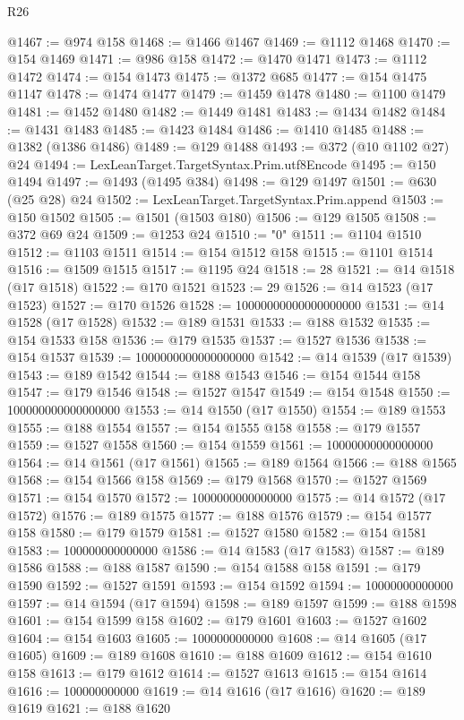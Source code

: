 \begin{lexlean}{R26}
\begin{coremodule}
@1467 := @974 @158
@1468 := @1466 @1467
@1469 := @1112 @1468
@1470 := @154 @1469
@1471 := @986 @158
@1472 := @1470 @1471
@1473 := @1112 @1472
@1474 := @154 @1473
@1475 := @1372 @685
@1477 := @154 @1475 @1147
@1478 := @1474 @1477
@1479 := @1459 @1478
@1480 := @1100 @1479
@1481 := @1452 @1480
@1482 := @1449 @1481
@1483 := @1434 @1482
@1484 := @1431 @1483
@1485 := @1423 @1484
@1486 := @1410 @1485
@1488 := @1382 (@1386 @1486)
@1489 := @129 @1488
@1493 := @372 (@10 @1102 @27) @24
@1494 := LexLeanTarget.TargetSyntax.Prim.utf8Encode
@1495 := @150 @1494
@1497 := @1493 (@1495 @384)
@1498 := @129 @1497
@1501 := @630 (@25 @28) @24
@1502 := LexLeanTarget.TargetSyntax.Prim.append
@1503 := @150 @1502
@1505 := @1501 (@1503 @180)
@1506 := @129 @1505
@1508 := @372 @69 @24
@1509 := @1253 @24
@1510 := "0"
@1511 := @1104 @1510
@1512 := @1103 @1511
@1514 := @154 @1512 @158
@1515 := @1101 @1514
@1516 := @1509 @1515
@1517 := @1195 @24
@1518 := 28
@1521 := @14 @1518 (@17 @1518)
@1522 := @170 @1521
@1523 := 29
@1526 := @14 @1523 (@17 @1523)
@1527 := @170 @1526
@1528 := 10000000000000000000
@1531 := @14 @1528 (@17 @1528)
@1532 := @189 @1531
@1533 := @188 @1532
@1535 := @154 @1533 @158
@1536 := @179 @1535
@1537 := @1527 @1536
@1538 := @154 @1537
@1539 := 1000000000000000000
@1542 := @14 @1539 (@17 @1539)
@1543 := @189 @1542
@1544 := @188 @1543
@1546 := @154 @1544 @158
@1547 := @179 @1546
@1548 := @1527 @1547
@1549 := @154 @1548
@1550 := 100000000000000000
@1553 := @14 @1550 (@17 @1550)
@1554 := @189 @1553
@1555 := @188 @1554
@1557 := @154 @1555 @158
@1558 := @179 @1557
@1559 := @1527 @1558
@1560 := @154 @1559
@1561 := 10000000000000000
@1564 := @14 @1561 (@17 @1561)
@1565 := @189 @1564
@1566 := @188 @1565
@1568 := @154 @1566 @158
@1569 := @179 @1568
@1570 := @1527 @1569
@1571 := @154 @1570
@1572 := 1000000000000000
@1575 := @14 @1572 (@17 @1572)
@1576 := @189 @1575
@1577 := @188 @1576
@1579 := @154 @1577 @158
@1580 := @179 @1579
@1581 := @1527 @1580
@1582 := @154 @1581
@1583 := 100000000000000
@1586 := @14 @1583 (@17 @1583)
@1587 := @189 @1586
@1588 := @188 @1587
@1590 := @154 @1588 @158
@1591 := @179 @1590
@1592 := @1527 @1591
@1593 := @154 @1592
@1594 := 10000000000000
@1597 := @14 @1594 (@17 @1594)
@1598 := @189 @1597
@1599 := @188 @1598
@1601 := @154 @1599 @158
@1602 := @179 @1601
@1603 := @1527 @1602
@1604 := @154 @1603
@1605 := 1000000000000
@1608 := @14 @1605 (@17 @1605)
@1609 := @189 @1608
@1610 := @188 @1609
@1612 := @154 @1610 @158
@1613 := @179 @1612
@1614 := @1527 @1613
@1615 := @154 @1614
@1616 := 100000000000
@1619 := @14 @1616 (@17 @1616)
@1620 := @189 @1619
@1621 := @188 @1620

\end{coremodule}
\end{lexlean}
